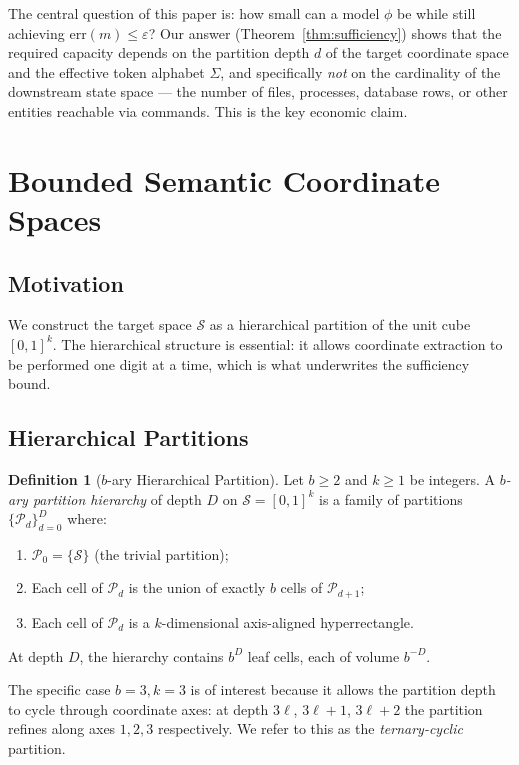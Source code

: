 \documentclass[11pt,a4paper]{article}
\theoremstyle{definition}
\newtheorem{definition}[theorem]{Definition}
\theoremstyle{remark}
\newcommand{\Sc}{\mathcal{S}}
\begin{document}
The central question of this paper is: how small can a model $\phi$ be while still achieving $\mathrm{err}(m) \leq \varepsilon$? Our answer (Theorem~\ref{thm:sufficiency}) shows that the required capacity depends on the partition depth $d$ of the target coordinate space and the effective token alphabet $\Sigma$, and specifically \emph{not} on the cardinality of the downstream state space --- the number of files, processes, database rows, or other entities reachable via commands. This is the key economic claim.

\section{Bounded Semantic Coordinate Spaces}
\label{sec:coord}

\subsection{Motivation}

We construct the target space $\Sc$ as a hierarchical partition of the unit cube $[0,1]^k$. The hierarchical structure is essential: it allows coordinate extraction to be performed one digit at a time, which is what underwrites the sufficiency bound.

\subsection{Hierarchical Partitions}

\begin{definition}[$b$-ary Hierarchical Partition]
\label{def:partition}
Let $b \geq 2$ and $k \geq 1$ be integers. A \emph{$b$-ary partition hierarchy} of depth $D$ on $\Sc = [0,1]^k$ is a family of partitions $\{\mathcal{P}_d\}_{d=0}^D$ where:
\begin{enumerate}
    \item $\mathcal{P}_0 = \{\Sc\}$ (the trivial partition);
    \item Each cell of $\mathcal{P}_d$ is the union of exactly $b$ cells of $\mathcal{P}_{d+1}$;
    \item Each cell of $\mathcal{P}_d$ is a $k$-dimensional axis-aligned hyperrectangle.
\end{enumerate}
At depth $D$, the hierarchy contains $b^D$ leaf cells, each of volume $b^{-D}$.
\end{definition}

The specific case $b = 3, k = 3$ is of interest because it allows the partition depth to cycle through coordinate axes: at depth $3\ell$, $3\ell+1$, $3\ell+2$ the partition refines along axes $1, 2, 3$ respectively. We refer to this as the \emph{ternary-cyclic} partition.
\end{document}
